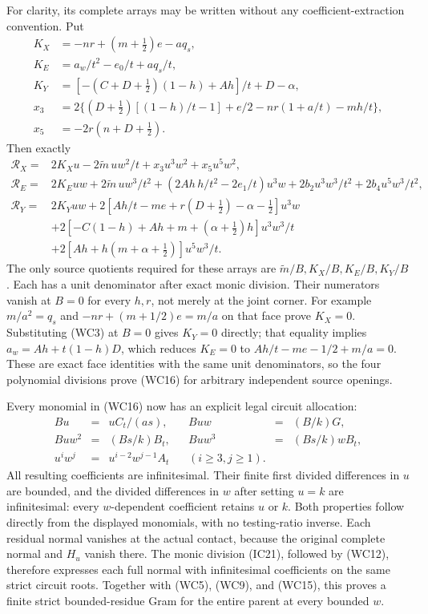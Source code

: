 For clarity, its complete arrays may be written without any
coefficient-extraction convention. Put
\[
\begin{aligned}
 K_X&=-nr+(m+\tfrac12)e-aq_s,\\
 K_E&=a_w/t^2-e_0/t+aq_s/t,\\
 K_Y&=[-(C+D+\tfrac12)(1-h)+Ah]/t+D-\alpha,\\
 x_3&=2\{(D+\tfrac12)[(1-h)/t-1]+e/2
                             -nr(1+a/t)-mh/t\},\\
 x_5&=-2r(n+D+\tfrac12).
\end{aligned}
\]
Then exactly
\[
\begin{aligned}
 \mathcal R_X={}&2K_Xu-2\widetilde m\,uw^2/t
                                  +x_3u^3w^2+x_5u^5w^2,\\
 \mathcal R_E={}&2K_Euw+2\widetilde m\,uw^3/t^2
 +(2Ah\,h/t^2-2e_1/t)u^3w
                    +2b_2u^3w^3/t^2+2b_4u^5w^3/t^2,\\
 \mathcal R_Y={}&2K_Yuw
 +2[Ah/t-me+r(D+\tfrac12)-\alpha-\tfrac12]u^3w\\
 &+2[-C(1-h)+Ah+m+(\alpha+\tfrac12)h]u^3w^3/t\\
 &+2[Ah+h(m+\alpha+\tfrac12)]u^5w^3/t.
\end{aligned}                                                    \tag{WC17a}
\]
The only source quotients required for these arrays are
$\widetilde m/B,K_X/B,K_E/B,K_Y/B$. Each has a unit denominator
after exact monic division. Their numerators vanish at $B=0$
for every $h,r$, not merely at the joint corner. For example
$m/a^2=q_s$ and $-nr+(m+1/2)e=m/a$ on that face prove
$K_X=0$. Substituting (WC3) at $B=0$ gives $K_Y=0$ directly;
that equality implies $a_w=Ah+t(1-h)D$, which reduces $K_E=0$
to $Ah/t-me-1/2+m/a=0$. These are exact face identities with
the same unit denominators, so the four polynomial divisions
prove (WC16) for arbitrary independent source openings.

Every monomial in (WC16) now has an explicit legal circuit allocation:
\[
\begin{array}{rclcrcl}
 Bu&=&uC_t/(as),&&Buw&=&(B/k)G,\\
 Buw^2&=&(Bs/k)B_t,&&Buw^3&=&(Bs/k)wB_t,\\
 u^iw^j&=&u^{i-2}w^{j-1}A_t&&(i\ge3,j\ge1).
\end{array}                                                    \tag{WC18}
\]
All resulting coefficients are infinitesimal. Their finite first
divided differences in $u$ are bounded, and the divided differences
in $w$ after setting $u=k$ are infinitesimal: every $w$-dependent
coefficient retains $u$ or $k$. Both properties follow directly
from the displayed monomials, with no testing-ratio inverse.
Each residual normal vanishes at the actual contact, because the
original complete normal and $H_u$ vanish there. The monic division
(IC21), followed by (WC12), therefore expresses each full normal
with infinitesimal coefficients on the same strict circuit roots.
Together with (WC5), (WC9), and (WC15), this proves a finite strict
bounded-residue Gram for the entire parent at every bounded $w$.

